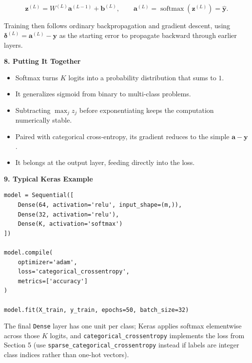 \documentclass[conference]{IEEEtran}
\begin{document}
\[
  \mathbf{z}^{(L)} = W^{(L)}\mathbf{a}^{(L-1)} + \mathbf{b}^{(L)},
  \qquad
  \mathbf{a}^{(L)} = \operatorname{softmax}\!\left(\mathbf{z}^{(L)}\right) = \hat{\mathbf{y}}.
\]

Training then follows ordinary backpropagation and gradient descent,
using $\boldsymbol{\delta}^{(L)} = \mathbf{a}^{(L)} - \mathbf{y}$ as the
starting error to propagate backward through earlier layers.

\bigskip

\textbf{8. Putting It Together}

\begin{itemize}
    \item Softmax turns $K$ logits into a probability distribution that
          sums to $1$.
    \item It generalizes sigmoid from binary to multi-class problems.
    \item Subtracting $\max_j z_j$ before exponentiating keeps the
          computation numerically stable.
    \item Paired with categorical cross-entropy, its gradient reduces to
          the simple $\mathbf{a}-\mathbf{y}$.
    \item It belongs at the output layer, feeding directly into the loss.
\end{itemize}

\bigskip

\textbf{9. Typical Keras Example}

\begin{verbatim}
model = Sequential([
    Dense(64, activation='relu', input_shape=(m,)),
    Dense(32, activation='relu'),
    Dense(K, activation='softmax')
])

model.compile(
    optimizer='adam',
    loss='categorical_crossentropy',
    metrics=['accuracy']
)

model.fit(X_train, y_train, epochs=50, batch_size=32)
\end{verbatim}

The final \texttt{Dense} layer has one unit per class; Keras applies
softmax elementwise across those $K$ logits, and
\texttt{categorical\_crossentropy} implements the loss from Section 5
(use \texttt{sparse\_categorical\_crossentropy} instead if labels are
integer class indices rather than one-hot vectors).
\end{document}
